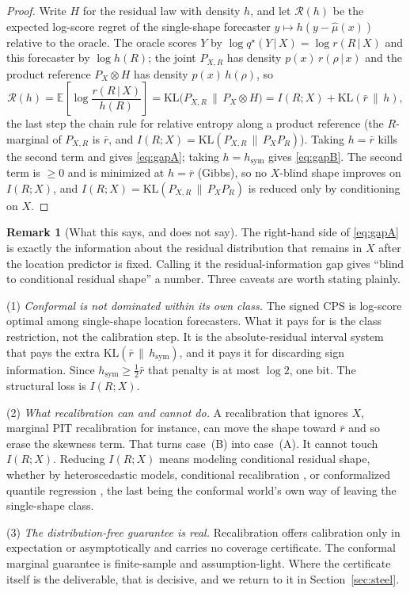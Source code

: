 \documentclass[11pt]{article}
\theoremstyle{definition}
\newtheorem{remark}{Remark}
\newcommand{\E}{\mathbb{E}}
\newcommand{\KL}{\mathrm{KL}}
\newcommand{\given}{\,\vert\,}
\begin{document}
\begin{proof}
Write $H$ for the residual law with density $h$, and let $\mathcal{R}(h)$ be the expected log-score
regret of the single-shape forecaster $y\mapsto h(y-\hat\mu(x))$ relative to the oracle. The
oracle scores $Y$ by $\log q^\star(Y\given X)=\log r(R\given X)$ and this forecaster by
$\log h(R)$; the joint $P_{X,R}$ has density $p(x)\,r(\rho\given x)$ and the product reference
$P_X\otimes H$ has density $p(x)\,h(\rho)$, so
\begin{equation}\label{eq:master}
  \mathcal{R}(h)=\E\!\left[\log\frac{r(R\given X)}{h(R)}\right]
      =\KL\!\big(P_{X,R}\,\big\|\,P_X\otimes H\big)
      = I(R;X)+\KL(\bar r\,\|\,h),
\end{equation}
the last step the chain rule for relative entropy along a product reference (the $R$-marginal
of $P_{X,R}$ is $\bar r$, and $I(R;X)=\KL(P_{X,R}\,\|\,P_X P_R)$). Taking $h=\bar r$ kills the
second term and gives \eqref{eq:gapA}; taking $h=h_{\mathrm{sym}}$ gives \eqref{eq:gapB}. The
second term is $\ge 0$ and is minimized at $h=\bar r$ (Gibbs), so no $X$-blind shape improves
on $I(R;X)$, and $I(R;X)=\KL(P_{X,R}\,\|\,P_X P_R)$ is reduced only by conditioning on $X$.
\end{proof}

\begin{remark}[What this says, and does not say]
The right-hand side of \eqref{eq:gapA} is exactly the information about the residual
distribution that remains in $X$ after the location predictor is fixed. Calling it the
residual-information gap gives ``blind to conditional residual shape'' a number. Three
caveats are worth stating plainly.

(1) \emph{Conformal is not dominated within its own class.} The signed CPS is log-score
optimal among single-shape location forecasters. What it pays for is the class restriction,
not the calibration step. It is the absolute-residual interval system that pays the extra
$\KL(\bar r\,\|\,h_{\mathrm{sym}})$, and it pays it for discarding sign information. Since
$h_{\mathrm{sym}}\ge\tfrac12\bar r$ that penalty is at most $\log 2$, one bit. The
structural loss is $I(R;X)$.

(2) \emph{What recalibration can and cannot do.} A recalibration that ignores $X$, marginal
PIT recalibration for instance, can move the shape toward $\bar r$ and so erase the skewness
term. That turns case~(B) into case~(A). It cannot touch $I(R;X)$. Reducing $I(R;X)$ means
modeling conditional residual shape, whether by heteroscedastic models, conditional
recalibration \citep{kuleshov2018accurate}, or conformalized quantile regression
\citep{romano2019conformalized}, the last being the conformal world's own way of leaving the
single-shape class.

(3) \emph{The distribution-free guarantee is real.} Recalibration offers calibration only in
expectation or asymptotically and carries no coverage certificate. The conformal marginal
guarantee is finite-sample and assumption-light. Where the certificate itself is the
deliverable, that is decisive, and we return to it in Section~\ref{sec:steel}.
\end{remark}
\end{document}
